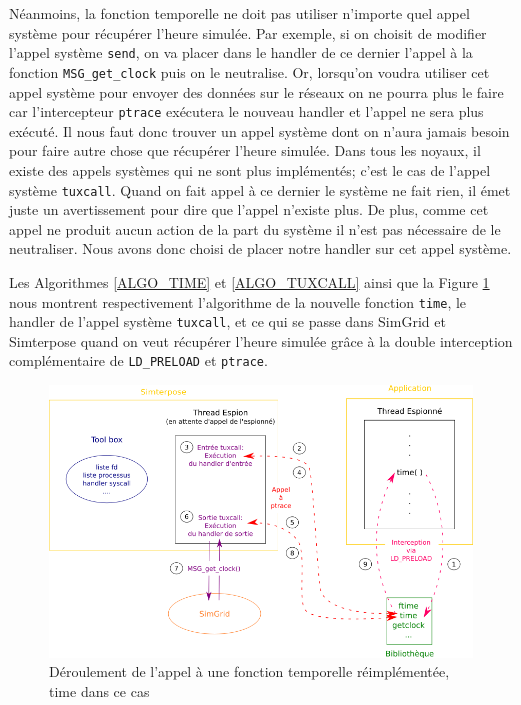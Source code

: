 Néanmoins, la fonction temporelle ne doit pas utiliser n'importe quel appel système pour récupérer l'heure simulée. Par exemple, si on choisit de modifier l'appel système \texttt{send}, on va placer dans le handler de ce dernier l'appel à la fonction \texttt{MSG\_get\_clock} puis on le neutralise. Or, lorsqu'on voudra utiliser cet appel système pour envoyer des données sur le réseaux on ne pourra plus le faire car l'intercepteur \texttt{ptrace} exécutera le nouveau handler et l'appel ne sera plus exécuté. Il nous faut donc trouver un appel système dont on n'aura jamais besoin pour faire autre chose que récupérer l'heure simulée. Dans tous les noyaux, il existe des appels systèmes qui ne sont plus implémentés; c'est le cas de l'appel système \texttt{tuxcall}. Quand on fait appel à ce dernier le système ne fait rien, il émet juste un avertissement pour dire que l'appel n'existe plus. De plus, comme cet appel ne produit aucun action de la part du système il n'est pas nécessaire de le neutraliser. Nous avons donc choisi de placer notre handler sur cet appel système.

Les Algorithmes \ref{ALGO_TIME} et \ref{ALGO_TUXCALL} ainsi que la Figure \ref{time_interception} nous montrent respectivement l'algorithme de la nouvelle fonction \texttt{time}, le handler de l'appel système \texttt{tuxcall}, et ce qui se passe dans SimGrid et Simterpose quand on veut récupérer l'heure simulée grâce à la double interception complémentaire de \texttt{LD\_PRELOAD} et \texttt{ptrace}.

\begin{figure}[H]
  \centering
  \includegraphics[scale=0.7]{Pictures/png/Open_pandor}
  \caption{Déroulement de l'appel à une fonction temporelle réimplémentée, time dans ce cas}
  \label{time_interception}
\end{figure}

